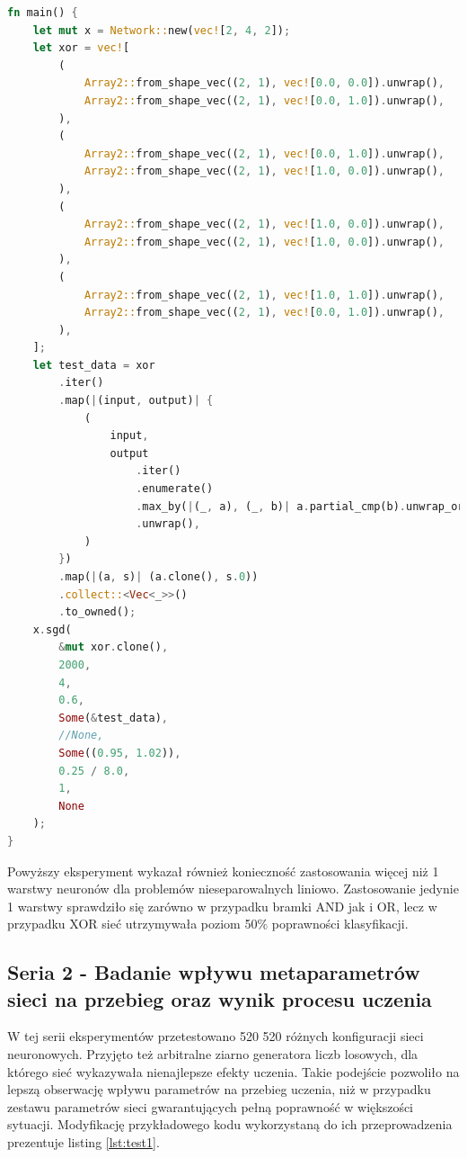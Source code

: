 \documentclass[12pt,twoside]{article}
\begin{document}
\begin{lstlisting}[language=Rust,caption=Skrypt uczący dla bramki logicznej XOR,label={lst:example_xor}]
	fn main() {
    let mut x = Network::new(vec![2, 4, 2]);
    let xor = vec![
        (
            Array2::from_shape_vec((2, 1), vec![0.0, 0.0]).unwrap(),
            Array2::from_shape_vec((2, 1), vec![0.0, 1.0]).unwrap(),
        ),
        (
            Array2::from_shape_vec((2, 1), vec![0.0, 1.0]).unwrap(),
            Array2::from_shape_vec((2, 1), vec![1.0, 0.0]).unwrap(),
        ),
        (
            Array2::from_shape_vec((2, 1), vec![1.0, 0.0]).unwrap(),
            Array2::from_shape_vec((2, 1), vec![1.0, 0.0]).unwrap(),
        ),
        (
            Array2::from_shape_vec((2, 1), vec![1.0, 1.0]).unwrap(),
            Array2::from_shape_vec((2, 1), vec![0.0, 1.0]).unwrap(),
        ),
    ];
    let test_data = xor
        .iter()
        .map(|(input, output)| {
            (
                input,
                output
                    .iter()
                    .enumerate()
                    .max_by(|(_, a), (_, b)| a.partial_cmp(b).unwrap_or(std::cmp::Ordering::Equal))
                    .unwrap(),
            )
        })
        .map(|(a, s)| (a.clone(), s.0))
        .collect::<Vec<_>>()
        .to_owned();
    x.sgd(
        &mut xor.clone(),
        2000,
        4,
        0.6,
        Some(&test_data),
        //None,
        Some((0.95, 1.02)),
        0.25 / 8.0,
        1,
        None
    );
}
\end{lstlisting}
Powyższy eksperyment wykazał również konieczność zastosowania więcej niż 1 warstwy neuronów dla problemów nieseparowalnych liniowo.
Zastosowanie jedynie 1 warstwy sprawdziło się zarówno w przypadku bramki AND jak i OR, lecz w przypadku XOR sieć utrzymywała poziom 50\% poprawności klasyfikacji.

\subsection{Seria 2 - Badanie wpływu metaparametrów sieci na przebieg oraz wynik procesu uczenia}
W tej serii eksperymentów przetestowano 520 520 różnych konfiguracji sieci neuronowych.
Przyjęto też arbitralne ziarno generatora liczb losowych, dla którego sieć wykazywała nienajlepsze efekty uczenia.
Takie podejście pozwoliło na lepszą obserwację wpływu parametrów na przebieg uczenia, niż w przypadku zestawu parametrów sieci gwarantujących pełną poprawność w większości sytuacji.
Modyfikację przykładowego kodu wykorzystaną do ich przeprowadzenia prezentuje listing \ref{lst:test1}.
\end{document}
